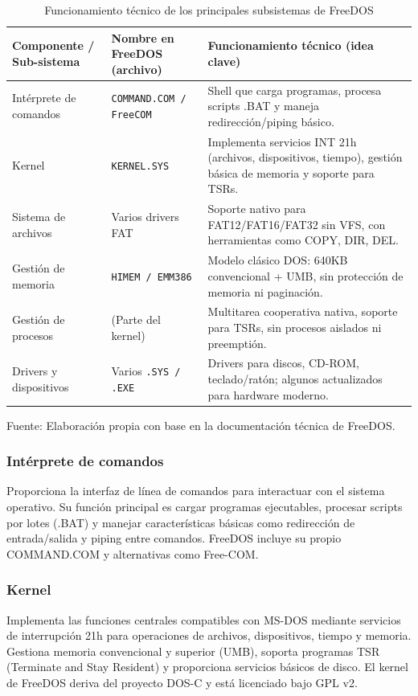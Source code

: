 \begin{table}[H]
\centering
\caption{Funcionamiento técnico de los principales subsistemas de FreeDOS}
\begin{tabular}{|p{5cm}|p{4cm}|p{6cm}|}
\hline
\textbf{Componente / Sub-sistema} & \textbf{Nombre en FreeDOS (archivo)} & \textbf{Funcionamiento técnico (idea clave)} \\ \hline
Intérprete de comandos & \texttt{COMMAND.COM / FreeCOM} & Shell que carga programas, procesa scripts .BAT y maneja redirección/piping básico. \\ \hline
Kernel & \texttt{KERNEL.SYS} & Implementa servicios INT 21h (archivos, dispositivos, tiempo), gestión básica de memoria y soporte para TSRs. \\ \hline
Sistema de archivos & Varios drivers FAT & Soporte nativo para FAT12/FAT16/FAT32 sin VFS, con herramientas como COPY, DIR, DEL. \\ \hline
Gestión de memoria & \texttt{HIMEM / EMM386} & Modelo clásico DOS: 640KB convencional + UMB, sin protección de memoria ni paginación. \\ \hline
Gestión de procesos & (Parte del kernel) & Multitarea cooperativa nativa, soporte para TSRs, sin procesos aislados ni preemptión. \\ \hline
Drivers y dispositivos & Varios \texttt{.SYS / .EXE} & Drivers para discos, CD-ROM, teclado/ratón; algunos actualizados para hardware moderno. \\ \hline
\end{tabular}
\label{fig:TablaFreeDOS}
\centering
Fuente: Elaboración propia con base en la documentación técnica de FreeDOS.
\end{table}

\subsubsection{Intérprete de comandos}
Proporciona la interfaz de línea de comandos para interactuar con el sistema operativo. Su función principal es cargar programas ejecutables, procesar scripts por lotes (.BAT) y manejar características básicas como redirección de entrada/salida y piping entre comandos. FreeDOS incluye su propio COMMAND.COM y alternativas como Free-COM. \citep[pag. 240--242 ]{freedos_kernel}

\subsubsection{Kernel}
Implementa las funciones centrales compatibles con MS-DOS mediante servicios de interrupción 21h para operaciones de archivos, dispositivos, tiempo y memoria. Gestiona memoria convencional y superior (UMB), soporta programas TSR (Terminate and Stay Resident) y proporciona servicios básicos de disco. El kernel de FreeDOS deriva del proyecto DOS-C y está licenciado bajo GPL v2. \citep{freedos_kernel}

